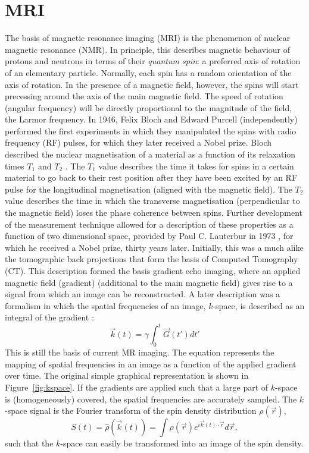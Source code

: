 \section*{MRI}
The basis of magnetic resonance imaging (MRI) is the phenomenon of nuclear magnetic resonance (NMR). In principle, this describes magnetic behaviour of protons and neutrons in terms of their \emph{quantum spin}: a preferred axis of rotation of an elementary particle. Normally, each spin has a random orientation of the axis of rotation. In the presence of a magnetic field, however, the spins will start precessing around the axis of the main magnetic field. The speed of rotation (angular frequency) will be directly proportional to the magnitude of the field, the Larmor frequency. In 1946, Felix Bloch and Edward Purcell (independently) performed the first experiments in which they manipulated the spins with radio frequency (RF) pulses, for which they later received a Nobel prize. Bloch described the nuclear magnetisation of a material as a function of its relaxation times $T_1$ and $T_2$ \cite{Bloch1946}. The $T_1$ value describes the time it takes for spins in a certain material to go back to their rest position after they have been excited by an RF pulse for the longitudinal magnetisation (aligned with the magnetic field). The $T_2$ value describes the time in which the transverse magnetisation (perpendicular to the magnetic field) loses the phase coherence between spins. Further development of the measurement technique allowed for a description of these properties as a function of two dimensional space, provided by Paul C. Lauterbur in 1973 \cite{Lauterbur1973}, for which he received a Nobel prize, thirty years later. Initially, this was a much alike the tomographic back projections that form the basis of Computed Tomography (CT). This description formed the basis gradient echo imaging, where an applied magnetic field (gradient) (additional to the main magnetic field) gives rise to a signal from which an image can be reconstructed. A later description was a formalism in which the spatial frequencies of an image, $k$-space, is described as an integral of the gradient \cite{Twieg1983,Ljunggren1983}:
\begin{equation}
\vec{k}(t)=\gamma \int_{0}^{t}\vec{G}(t')dt'
\end{equation}
This is still the basis of current MR imaging. The equation represents the mapping of spatial frequencies in an image as a function of the applied gradient over time. The original simple graphical representation is shown in Figure~\ref{fig:kspace}. If the gradients are applied such that a large part of $k$-space is (homogeneously) covered, the spatial frequencies are accurately sampled. The $k$-space signal is the Fourier transform of the spin density distribution $\rho (\vec{r})$, 
\begin{equation}
S(t)=\hat{\rho}(\vec{k}(t))=\int\rho(\vec{r})e^{i \vec{k}(t) \cdot \vec{r}}d\vec{r},
\end{equation}
such that the $k$-space can easily be transformed into an image of the spin density.


